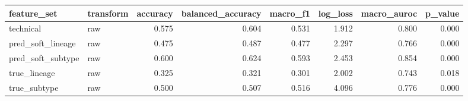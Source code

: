\begin{tabular}{llrrrrrr}
\toprule
feature\_set & transform & accuracy & balanced\_accuracy & macro\_f1 & log\_loss & macro\_auroc & p\_value \\
\midrule
technical & raw & 0.575 & 0.604 & 0.531 & 1.912 & 0.800 & 0.000 \\
pred\_soft\_lineage & raw & 0.475 & 0.487 & 0.477 & 2.297 & 0.766 & 0.000 \\
pred\_soft\_subtype & raw & 0.600 & 0.624 & 0.593 & 2.453 & 0.854 & 0.000 \\
true\_lineage & raw & 0.325 & 0.321 & 0.301 & 2.002 & 0.743 & 0.018 \\
true\_subtype & raw & 0.500 & 0.507 & 0.516 & 4.096 & 0.776 & 0.000 \\
\bottomrule
\end{tabular}
